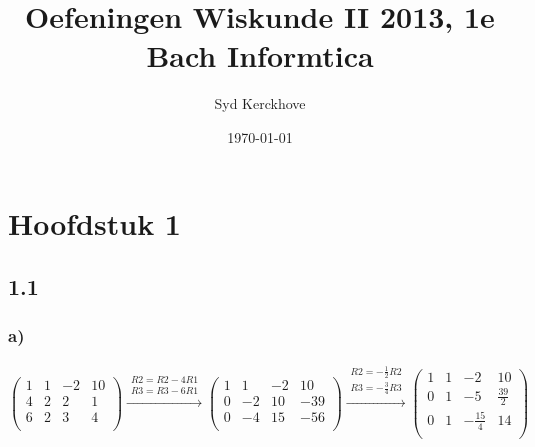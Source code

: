 \documentclass[11pt]{article}
\title{Oefeningen Wiskunde II 2013, 1e Bach Informtica}
\author{Syd Kerckhove}
\date{\today}
\begin{document}
\maketitle
\section*{Hoofdstuk 1}
\subsection*{1.1}
\subsubsection*{a)}

\[
\begin{pmatrix}
  1 & 1 & -2 & 10 \\
  4 & 2 & 2 & 1 \\
  6 & 2 & 3 & 4  \\
 \end{pmatrix} 
 \overset{\begin{matrix}
  R2 = R2-4R1 \\
  R3 = R3-6R1
 \end{matrix}}{\rightarrow} 
 \begin{pmatrix}
  1 & 1 & -2 & 10 \\
  0 & -2 & 10 & -39 \\
  0 & -4 & 15 & -56  \\
 \end{pmatrix}
 \overset{\begin{matrix}
  R2 = -\frac{1}{2}R2 \\
  R3 = -\frac{3}{4}R3
 \end{matrix}}{\rightarrow} 
 \begin{pmatrix}
  1 & 1 & -2 & 10 \\
  0 & 1 & -5 & \frac{39}{2} \\
  0 & 1 & -\frac{15}{4} & 14  \\
 \end{pmatrix}
\]
\end{document}
